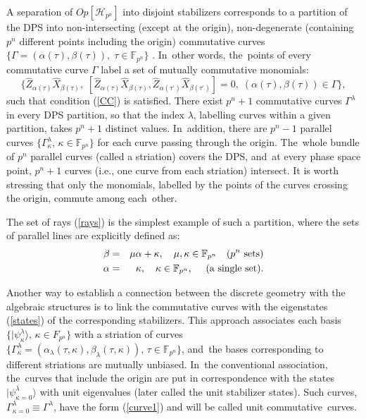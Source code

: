 \documentclass[quantumrep,article,accept,pdftex,moreauthors]{Definitions/mdpi}
\begin{document}
A separation of $Op[\mathcal{H}_{p^{n}}]$ into disjoint stabilizers corresponds
to a partition of the DPS into non-intersecting (except at the origin),
non-degenerate (containing $p^{n}$ different points including the origin)
commutative curves $\{\Gamma =\left( \alpha(\tau),\beta(\tau)\right),
\; \tau \in \mathbb{F}_{p^{n}}\}$ \cite{GS2,JPA09}. In~other words, the~points
of every commutative curve $\Gamma$ label a set of mutually commutative
monomials:
\begin{equation}
  \{\hat{Z}_{\alpha(\tau)}\hat{X}_{\beta(\tau)}, \;
  [\hat{Z}_{\alpha(\tau)} \hat{X}_{\beta(\tau)},
  \hat{Z}_{\alpha (\tau^{\prime})}\hat{X}_{\beta(\tau^{\prime})}]
  = 0, \; \left( \alpha(\tau),\beta(\tau)\right) \in \Gamma \},
\end{equation}
such that  condition (\ref{CC}) is satisfied. There exist $p^{n}+1$
commutative curves $\Gamma^{\lambda}$ in every DPS partition, so that the index
$\lambda$, labelling curves within a given partition, takes $p^{n}+1$ distinct
values. In~addition, there are $p^{n}-1$ parallel curves
$\{\Gamma_{\kappa}^{\lambda}$, $\kappa \in \mathbb{F}_{p^{n}}\}$ for each curve
passing through the origin.  The~whole bundle of $p^{n}$ parallel curves (called
a striation) covers the DPS, and~at every phase space point, $p^{n}+1$ curves
(i.e.,  one curve from each striation) intersect. It is worth stressing that only
the monomials, labelled by the points of the curves crossing the origin, commute
among each~other.

The set of rays (\ref{rays}) is the simplest example of such a partition, where
the sets of parallel lines are explicitly defined as:
\begin{eqnarray}
  \beta
  &=& \mu \alpha + \kappa, \quad \mu, \kappa \in \mathbb{F}_{p^{n}}
  \quad \text{($p^{n}$ sets)}
  \label{rays0} \\
  \alpha
  &=& \kappa, \quad \kappa \in \mathbb{F}_{p^{n}},
  \quad \text{ (a single set).}
  \notag
\end{eqnarray}

Another way to establish a connection between the discrete geometry with the
algebraic structures is to link the commutative curves with the eigenstates
(\ref{states}) of the corresponding stabilizers. This approach associates each
basis $\{|\psi_{\kappa}^{\lambda}\rangle $, $\kappa \in F_{p^{n}}\}$ with a
striation of curves $\{\Gamma_{\kappa}^{\lambda} = \left(
\alpha_{\lambda}(\tau,\kappa),\beta_{\lambda}(\tau,\kappa)\right) ,\,\tau \in
\mathbb{F}_{p^{n}}\}$, and~the bases corresponding to different striations are
mutually unbiased. In~the conventional association, the~curves that include the
origin are put in correspondence with the states $|\psi_{\kappa =
0}^{\lambda}\rangle $ with unit eigenvalues (later called the unit stabilizer
states). Such curves, $\Gamma_{\kappa=0}^{\lambda} \equiv \Gamma^{\lambda}$,
have the form (\ref{curve1}) and will be called unit commutative~curves. 
\end{document}

